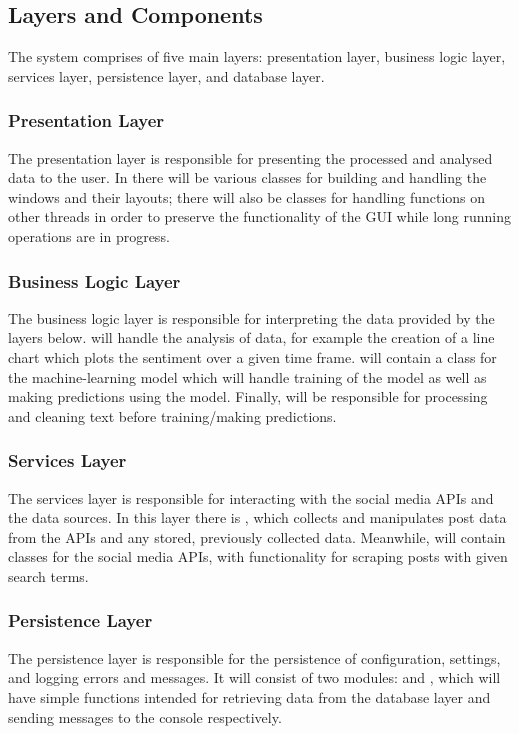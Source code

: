     \subsection{Layers and Components}
    The system comprises of five main layers: presentation layer, business logic layer, services layer, persistence layer, and database layer.

        \subsubsection{Presentation Layer}
        The presentation layer is responsible for presenting the processed and analysed data to the user. In  there will be various classes for building and handling the windows and their layouts; there will also be classes for handling functions on other threads in order to preserve the functionality of the GUI while long running operations are in progress.

        \subsubsection{Business Logic Layer}
        The business logic layer is responsible for interpreting the data provided by the layers below.  will handle the analysis of data, for example the creation of a line chart which plots the sentiment over a given time frame.  will contain a class for the machine-learning model which will handle training of the model as well as making predictions using the model. Finally,  will be responsible for processing and cleaning text before training/making predictions.

        \subsubsection{Services Layer}
        The services layer is responsible for interacting with the social media APIs and the data sources. In this layer there is , which collects and manipulates post data from the APIs and any stored, previously collected data. Meanwhile,  will contain classes for the social media APIs, with functionality for scraping posts with given search terms.

        \subsubsection{Persistence Layer}
        The persistence layer is responsible for the persistence of configuration, settings, and logging errors and messages. It will consist of two modules:  and , which will have simple functions intended for retrieving data from the database layer and sending messages to the console respectively.


